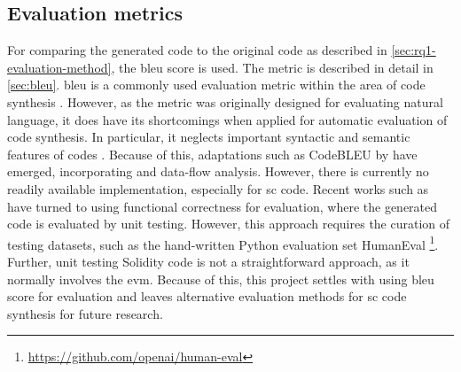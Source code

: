 %
%
%

\subsection{Evaluation metrics}
\label{sec:rq1-evaluation-metrics}
For comparing the generated code to the original code as described in \cref{sec:rq1-evaluation-method}, the \gls{bleu} score is used. The metric is described in detail in \cref{sec:bleu}. \acrshort{bleu} is a commonly used evaluation metric within the area of code synthesis \cite{ren2020codebleu}. However, as the metric was originally designed for evaluating natural language, it does have its shortcomings when applied for automatic evaluation of code synthesis. In particular, it neglects important syntactic and semantic features of codes \cite{ren2020codebleu}. Because of this, adaptations such as CodeBLEU by \textcite{ren2020codebleu} have emerged, incorporating  and data-flow analysis. However, there is currently no readily available implementation, especially for \acrshort{sc} code. Recent works such as \cite{alphacode,lachaux2020unsupervised,chen2021codex} have turned to using functional correctness for evaluation, where the generated code is evaluated by unit testing. However, this approach requires the curation of testing datasets, such as the hand-written Python evaluation set HumanEval \footnote{\url{https://github.com/openai/human-eval}}. Further, unit testing Solidity code is not a straightforward approach, as it normally involves the \acrshort{evm}. Because of this, this project settles with using \gls{bleu} score for evaluation and leaves alternative evaluation methods for \acrshort{sc} code synthesis for future research.

